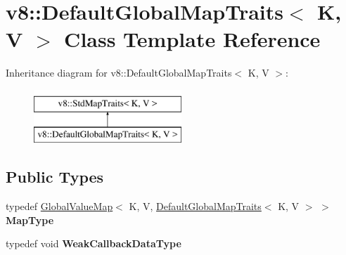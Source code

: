 \hypertarget{classv8_1_1DefaultGlobalMapTraits}{}\section{v8\+:\+:Default\+Global\+Map\+Traits$<$ K, V $>$ Class Template Reference}
\label{classv8_1_1DefaultGlobalMapTraits}
Inheritance diagram for v8\+:\+:Default\+Global\+Map\+Traits$<$ K, V $>$\+:\begin{figure}[H]
\begin{center}
\leavevmode
\includegraphics[height=2.000000cm]{classv8_1_1DefaultGlobalMapTraits}
\end{center}
\end{figure}
\subsection*{Public Types}
\begin{DoxyCompactItemize}
\item 
\mbox{\label{classv8_1_1DefaultGlobalMapTraits_a6626b089621a436fde5ac1a1132cc83c}} 
typedef \mbox{\hyperlink{classv8_1_1GlobalValueMap}{Global\+Value\+Map}}$<$ K, V, \mbox{\hyperlink{classv8_1_1DefaultGlobalMapTraits}{Default\+Global\+Map\+Traits}}$<$ K, V $>$ $>$ {\bfseries Map\+Type}
\item 
\mbox{\label{classv8_1_1DefaultGlobalMapTraits_af5285197aae83dcb00d0381fbc90869e}} 
typedef void {\bfseries Weak\+Callback\+Data\+Type}
\end{DoxyCompactItemize}
